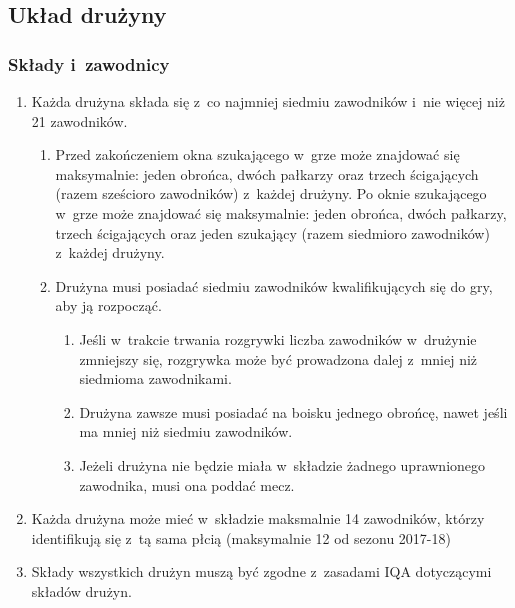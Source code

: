 \documentclass[12pt,a4paper]{article}
\begin{document}
\subsection{Układ drużyny}

\subsubsection{Składy i~zawodnicy}

\begin{enumerate}
	\item
	      Każda drużyna składa się z~co najmniej siedmiu zawodników i~nie więcej
	      niż 21 zawodników.

	      \begin{enumerate}
		      \item
		            Przed zakończeniem okna szukającego w~grze może znajdować się
		            maksymalnie: jeden obrońca, dwóch pałkarzy oraz trzech ścigających
		            (razem sześcioro zawodników) z~każdej drużyny. Po oknie szukającego
		            w~grze może znajdować się maksymalnie: jeden obrońca, dwóch
		            pałkarzy, trzech ścigających oraz jeden szukający (razem siedmioro
		            zawodników) z~każdej drużyny.
		      \item
		            Drużyna musi posiadać siedmiu zawodników kwalifikujących się do gry,
		            aby ją rozpocząć.

		            \begin{enumerate}
			            \item
			                  Jeśli w~trakcie trwania rozgrywki liczba zawodników w~drużynie
			                  zmniejszy się, rozgrywka może być prowadzona dalej z~mniej niż
			                  siedmioma zawodnikami.
			            \item
			                  Drużyna zawsze musi posiadać na boisku jednego obrońcę, nawet jeśli ma mniej niż siedmiu zawodników.
			            \item
			                  Jeżeli drużyna nie będzie miała w~składzie żadnego uprawnionego
			                  zawodnika, musi ona poddać mecz.
		            \end{enumerate}
	      \end{enumerate}
	\item
	      Każda drużyna może mieć w~składzie maksmalnie 14 zawodników, którzy
	      identifikują się z~tą sama płcią (maksymalnie 12 od sezonu 2017-18)
	\item
	      Składy wszystkich drużyn muszą być zgodne z~zasadami IQA dotyczącymi
	      składów drużyn.
\end{enumerate}
\end{document}
